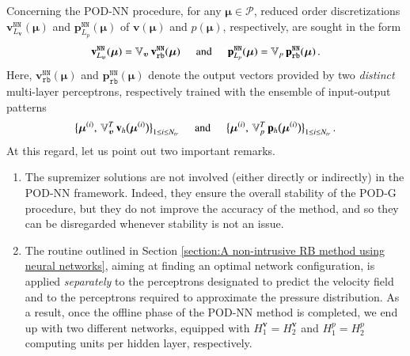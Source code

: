 \documentclass[longtitle]{elsarticle}
\numberwithin{equation}{section}
\theoremstyle{theorem}
\theoremstyle{definition}
\theoremstyle{remark}
\theoremstyle{proposition}
\numberwithin{figure}{section}
\newcommand{\bg}[1]{\boldsymbol{#1}}
\begin{document}
		Concerning the POD-NN procedure, for any $\bg{\mu} \in \mathcal{P}$, reduced order discretizations $\mathbf{v}_{L_{\bg{v}}}^{\texttt{NN}}(\bg{\mu})$ and $\mathbf{p}_{L_p}^{\texttt{NN}}(\bg{\mu})$ of $\bg{v}(\bg{\mu})$ and $p(\bg{\mu})$, respectively, are sought in the form
		\begin{equation*}
			\mathbf{v}_{L_{\bg{v}}}^{\texttt{NN}}(\bg{\mu}) = \mathbb{V}_{\bg{v}} \, \mathbf{v}_{\texttt{rb}}^{\texttt{NN}}(\bg{\mu}) \hspace*{0.5cm} \text{and} \hspace*{0.5cm} \mathbf{p}_{L_p}^{\texttt{NN}}(\bg{\mu}) = \mathbb{V}_{p} \, \mathbf{p}_{\texttt{rb}}^{\texttt{NN}}(\bg{\mu}) \, .
		\end{equation*}
		Here, $\mathbf{v}_{\texttt{rb}}^{\texttt{NN}}(\bg{\mu})$ and $\mathbf{p}_{\texttt{rb}}^{\texttt{NN}}(\bg{\mu})$ denote the output vectors provided by two \emph{distinct} multi-layer perceptrons, respectively trained with the ensemble of input-output patterns
		\begin{equation*}
			\big\lbrace \bg{\mu}^{(i)}, \, \mathbb{V}_{\bg{v}}^T \, \mathbf{v}_h \big( \bg{\mu}^{(i)} \big) \big\rbrace_{1 \leq i \leq N_{tr}} \hspace*{0.5cm} \text{and} \hspace*{0.5cm} \big\lbrace \bg{\mu}^{(i)}, \, \mathbb{V}_{p}^T \, \mathbf{p}_h \big( \bg{\mu}^{(i)} \big) \big\rbrace_{1 \leq i \leq N_{tr}} \, .
		\end{equation*}
		At this regard, let us point out two important remarks.
		\begin{enumerate}[label=(\roman*)]
			\item The supremizer solutions are not involved (either directly or indirectly) in the POD-NN framework. Indeed, they ensure the overall stability of the POD-G procedure, but they do not improve the accuracy of the method, and so they can be disregarded whenever stability is not an issue.
			\item The routine outlined in Section \ref{section:A non-intrusive RB method using neural networks}, aiming at finding an optimal network configuration, is applied \emph{separately} to the perceptrons designated to predict the velocity field and to the perceptrons required to approximate the pressure distribution. As a result, once the offline phase of the POD-NN method is completed, we end up with two different networks, equipped with $H_1^{\bg{v}} = H_2^{\bg{v}}$ and $H_1^p = H_2^p$ computing units per hidden layer, respectively.  
		\end{enumerate}
\end{document}
